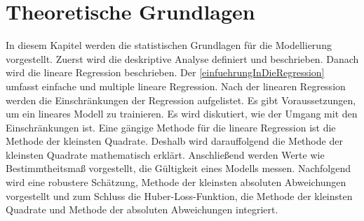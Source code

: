 \newpage
\section{Theoretische Grundlagen}
\label{TheoretischeGrundlagen}
In diesem Kapitel werden die statistischen Grundlagen für die Modellierung vorgestellt. Zuerst wird die deskriptive Analyse definiert und beschrieben. Danach wird die lineare Regression beschrieben. Der \autoref{einfuehrungInDieRegression} umfasst einfache und multiple lineare Regression. Nach der linearen Regression werden die Einschränkungen der Regression aufgelistet. Es gibt Voraussetzungen, um ein lineares Modell zu trainieren. Es wird diskutiert, wie der Umgang mit den Einschränkungen ist. Eine gängige Methode für die lineare Regression ist die Methode der kleinsten Quadrate. Deshalb wird darauffolgend die Methode der kleinsten Quadrate mathematisch erklärt. Anschließend werden Werte wie Bestimmtheitsmaß vorgestellt, die Gültigkeit eines Modells messen. Nachfolgend wird eine robustere Schätzung, Methode der kleinsten absoluten Abweichungen vorgestellt und zum Schluss die Huber-Loss-Funktion, die Methode der kleinsten Quadrate und Methode der absoluten Abweichungen integriert. 
